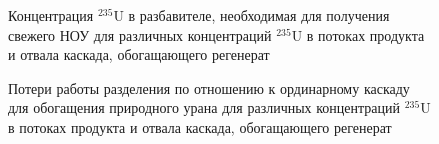 \begin{figure}[ht]
  \caption{Концентрация $^{235}$U в разбавителе, необходимая для получения свежего НОУ для различных концентраций $^{235}$U в потоках продукта и отвала каскада, обогащающего регенерат}\label{fig:sc2_LEU_D}
\end{figure}

\begin{figure}[ht]
  \caption{Потери работы разделения по отношению к ординарному каскаду для обогащения природного урана для различных концентраций $^{235}$U в потоках продукта и отвала каскада, обогащающего регенерат}\label{Figure_13}
\end{figure}

